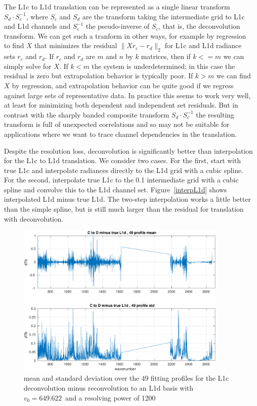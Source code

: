 \documentclass[11pt]{article}
\begin{document}
The L1c to L1d translation can be represented as a single linear
transform $S_d\cdot S_c^{-1}$, where $S_c$ and $S_d$ are the
transform taking the intermediate grid to L1c and L1d channels and
$S_c^{-1}$ the pseudo-inverse of $S_c$, that is, the deconvolution
transform.  We can get such a tranform in other ways, for example by
regression to find $X$ that minimizes the residual $\|X r_c -
r_d\|_2$ for L1c and L1d radiance sets $r_c$ and $r_d$.  If $r_c$ and
$r_d$ are $m$ and $n$ by $k$ matrices, then if $k <= m$ we can simply
solve for $X$.  If $k < m$ the system is underdetermined; in this
case the residual is zero but extrapolation behavior is typically
poor.  If $k > m$ we can find $X$ by regression, and extrapolation
behavior can be quite good if we regress against large sets of
representative data.  In practice this seems to work very well, at
least for minimizing both dependent and independent set residuals.
But in contrast with the sharply banded composite transform $S_d\cdot
S_c^{-1}$ the resulting transform is full of unexpected correlations
and so may not be suitable for applications where we want to trace
channel dependencies in the translation.

Despite the resolution loss, deconvolution is significantly better
than interpolation for the L1c to L1d translation.  We consider two
cases.  For the first, start with true L1c and interpolate radiances
directly to the L1d grid with a cubic spline.  For the second,
interpolate true L1c to the 0.1 {\wn} intermediate grid with a cubic
spline and convolve this to the L1d channel set.
Figure~\ref{interpL1d} shows interpolated L1d minus true L1d.  The
two-step interpolation works a little better than the simple spline,
but is still much larger than the residual for translation with
deconvolution.

\begin{figure} %
  \centering
  \includegraphics[height=7.5cm]{figures/CtoD1200_diff.pdf}
  \caption{mean and standard deviation over the 49 fitting profiles
    for the L1c deconvolution minus reconvolution to an L1d basis
    with $v_0=649.622$~\wn and a resolving power of 1200}
  \label{L1d1200}
\end{figure}
\end{document}
